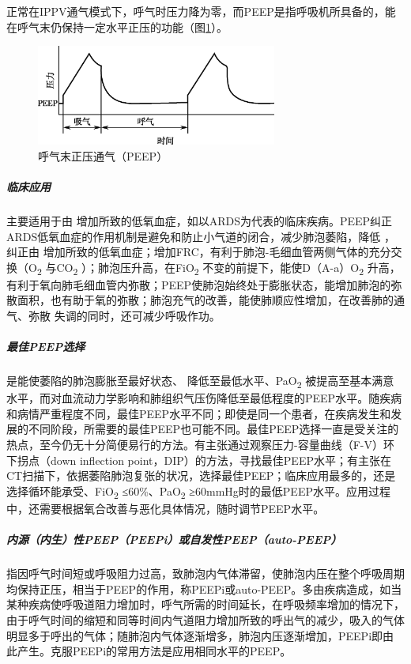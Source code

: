 正常在IPPV通气模式下，呼气时压力降为零，而PEEP是指呼吸机所具备的，能在呼气末仍保持一定水平正压的功能（图\ref{fig136-9}）。

\begin{figure}[!htbp]
 \centering
 \includegraphics[width=3.11458in,height=1.30208in]{./images/Image00516.jpg}
 \captionsetup{justification=centering}
 \caption{呼气末正压通气（PEEP）}
 \label{fig136-9}
  \end{figure} 

\subparagraph{临床应用}

主要适用于由{}
增加所致的低氧血症，如以ARDS为代表的临床疾病。PEEP纠正ARDS低氧血症的作用机制是避免和防止小气道的闭合，减少肺泡萎陷，降低{}
，纠正由{}
增加所致的低氧血症；增加FRC，有利于肺泡-毛细血管两侧气体的充分交换（O\textsubscript{2}
与CO\textsubscript{2} ）；肺泡压升高，在FiO\textsubscript{2}
不变的前提下，能使D（A-a）O\textsubscript{2}
升高，有利于氧向肺毛细血管内弥散；PEEP使肺泡始终处于膨胀状态，能增加肺泡的弥散面积，也有助于氧的弥散；肺泡充气的改善，能使肺顺应性增加，在改善肺的通气、弥散{}
失调的同时，还可减少呼吸作功。

\subparagraph{最佳PEEP选择}

是能使萎陷的肺泡膨胀至最好状态、{} 降低至最低水平、PaO\textsubscript{2}
被提高至基本满意水平，而对血流动力学影响和肺组织气压伤降低至最低程度的PEEP水平。随疾病和病情严重程度不同，最佳PEEP水平不同；即使是同一个患者，在疾病发生和发展的不同阶段，所需要的最佳PEEP也可能不同。最佳PEEP选择一直是受关注的热点，至今仍无十分简便易行的方法。有主张通过观察压力-容量曲线（F-V）环下拐点（down
inflection
point，DIP）的方法，寻找最佳PEEP水平；有主张在CT扫描下，依据萎陷肺泡复张的状况，选择最佳PEEP；临床应用最多的，还是选择循环能承受、FiO\textsubscript{2}
≤60\%、PaO\textsubscript{2}
≥60mmHg时的最低PEEP水平。应用过程中，还需要根据氧合改善与恶化具体情况，随时调节PEEP水平。

\subparagraph{内源（内生）性PEEP（PEEPi）或自发性PEEP（auto-PEEP）}

指因呼气时间短或呼吸阻力过高，致肺泡内气体滞留，使肺泡内压在整个呼吸周期均保持正压，相当于PEEP的作用，称PEEPi或auto-PEEP。多由疾病造成，如当某种疾病使呼吸道阻力增加时，呼气所需的时间延长，在呼吸频率增加的情况下，由于呼气时间的缩短和同等时间内气道阻力增加所致的呼出气的减少，吸入的气体明显多于呼出的气体；随肺泡内气体逐渐增多，肺泡内压逐渐增加，PEEPi即由此产生。克服PEEPi的常用方法是应用相同水平的PEEP。

